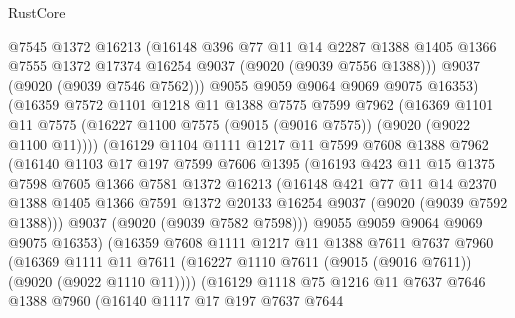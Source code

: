 \begin{lexlean}{RustCore}
\begin{coremodule}
            @7545
            @1372
            @16213
            (@16148
              @396
              @77
              @11
              @14
              @2287
              @1388
              @1405
              @1366
              @7555
              @1372
              @17374
              @16254
              @9037
              (@9020 (@9039 @7556 @1388)))
            @9037
            (@9020 (@9039 @7546 @7562)))
          @9055
          @9059
          @9064
          @9069
          @9075
          @16353)
        (@16359
          @7572
          @1101
          @1218
          @11
          @1388
          @7575
          @7599
          @7962
          (@16369
            @1101
            @11
            @7575
            (@16227 @1100 @7575 (@9015 (@9016 @7575)) (@9020 (@9022 @1100 @11))))
          (@16129
            @1104
            @1111
            @1217
            @11
            @7599
            @7608
            @1388
            @7962
            (@16140
              @1103
              @17
              @197
              @7599
              @7606
              @1395
              (@16193
                @423
                @11
                @15
                @1375
                @7598
                @7605
                @1366
                @7581
                @1372
                @16213
                (@16148
                  @421
                  @77
                  @11
                  @14
                  @2370
                  @1388
                  @1405
                  @1366
                  @7591
                  @1372
                  @20133
                  @16254
                  @9037
                  (@9020 (@9039 @7592 @1388)))
                @9037
                (@9020 (@9039 @7582 @7598)))
              @9055
              @9059
              @9064
              @9069
              @9075
              @16353)
            (@16359
              @7608
              @1111
              @1217
              @11
              @1388
              @7611
              @7637
              @7960
              (@16369
                @1111
                @11
                @7611
                (@16227 @1110 @7611 (@9015 (@9016 @7611)) (@9020 (@9022 @1110 @11))))
              (@16129
                @1118
                @75
                @1216
                @11
                @7637
                @7646
                @1388
                @7960
                (@16140
                  @1117
                  @17
                  @197
                  @7637
                  @7644

\end{coremodule}
\end{lexlean}
